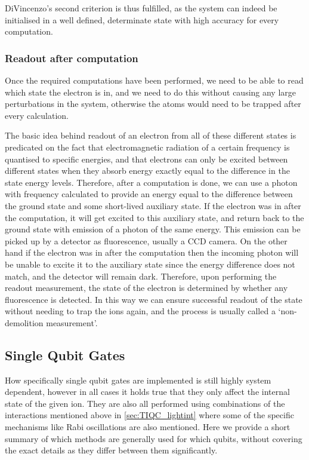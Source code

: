 DiVincenzo's second criterion is thus fulfilled, as the system can indeed be initialised in a well defined, determinate state with high accuracy for every computation.

\subsubsection{Readout after computation}
Once the required computations have been performed, we need to be able to read which state the electron is in, and we need to do this without causing any large perturbations in the system, otherwise the atoms would need to be trapped after every calculation. 

The basic idea behind readout of an electron from all of these different states is predicated on the fact that electromagnetic radiation of a certain frequency is quantised to specific energies, and that electrons can only be excited between different states when they absorb energy exactly equal to the difference in the state energy levels. Therefore, after a computation is done, we can use a photon with frequency calculated to provide an energy equal to the difference between the ground state \kz and some short-lived auxiliary state. If the electron was in \kz after the computation, it will get excited to this auxiliary state, and return back to the ground state with emission of a photon of the same energy. This emission can be picked up by a detector as fluorescence, usually a CCD camera. On the other hand if the electron was in \ko after the computation then the incoming photon will be unable to excite it to the auxiliary state since the energy difference does not match, and the detector will remain dark. Therefore, upon performing the readout measurement, the state of the electron is determined by whether any fluorescence is detected. In this way we can ensure successful readout of the state without needing to trap the ions again, and the process is usually called a `non-demolition measurement'\cite{qndm}.


\subsection{Single Qubit Gates}
How specifically single qubit gates are implemented is still highly system dependent, however in all cases it holds true that they only affect the internal state of the given ion.
They are also all performed using combinations of the interactions mentioned above in \cref{sec:TIQC_lightint} where some of the specific mechanisms like Rabi oscillations are also mentioned.
Here we provide a short summary of which methods are generally used for which qubits, without covering the exact details as they differ between them significantly.

